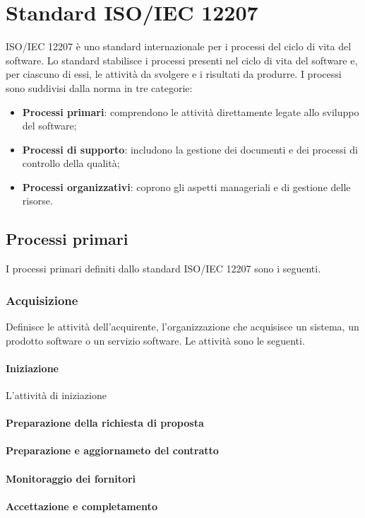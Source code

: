 \appendix
\section{Standard ISO/IEC 12207}
ISO/IEC 12207 è uno standard internazionale per i processi del ciclo di vita del software. Lo standard stabilisce i processi presenti nel ciclo di vita del software e, per ciascuno di essi, le attività da svolgere e i risultati da produrre.
I processi sono suddivisi dalla norma in tre categorie:

\begin{itemize}
	
	\item \textbf{Processi primari}: comprendono le attività direttamente legate allo sviluppo del software;
	
	\item \textbf{Processi di supporto}: includono la gestione dei documenti e dei processi di controllo della qualità;
	
	\item \textbf{Processi organizzativi}: coprono gli aspetti manageriali e di gestione delle risorse.
	
\end{itemize}

\subsection{Processi primari}
I processi primari definiti dallo standard ISO/IEC 12207 sono i seguenti.

\subsubsection{Acquisizione}
Definisce le attività dell'acquirente, l'organizzazione che acquisisce un sistema, un prodotto software o un servizio software.
Le attività sono le seguenti.

\paragraph{Iniziazione}
L'attività di iniziazione 

\paragraph{Preparazione della richiesta di proposta}

\paragraph{Preparazione e aggiornameto del contratto}

\paragraph{Monitoraggio dei fornitori}

\paragraph{Accettazione e completamento}




    

    


